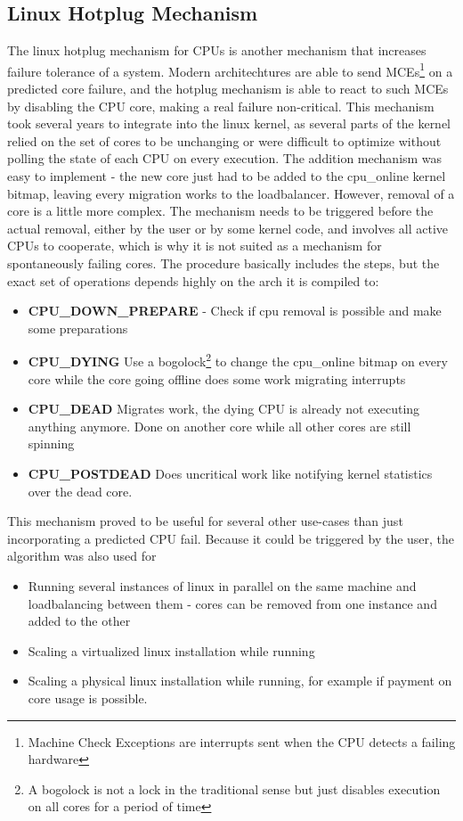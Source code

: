 \documentclass[a4paper,10pt,twoside]{article}
\begin{document}
\subsection{Linux Hotplug Mechanism} \label{hotplug}
The linux hotplug mechanism for CPUs \cite{Linux_Hotplug} is another mechanism that increases failure tolerance of a system. Modern architechtures are able to send MCEs\footnote{Machine Check Exceptions are interrupts sent when the CPU detects a failing hardware} on a predicted core failure, and the hotplug mechanism is able to react to such MCEs by disabling the CPU core, making a real failure non-critical. This mechanism took several years to integrate into the linux kernel, as several parts of the kernel relied on the set of cores to be unchanging or were difficult to optimize without polling the state of each CPU on every execution. The addition mechanism was easy to implement - the new core just had to be added to the cpu\_online kernel bitmap, leaving every migration works to the loadbalancer. However, removal of a core is a little more complex. The mechanism needs to be triggered before the actual removal, either by the user or by some kernel code, and involves all active CPUs to cooperate, which is why it is not suited as a mechanism for spontaneously failing cores. The procedure basically includes the steps, but the exact set of operations depends highly on the arch it is compiled to:
\begin{itemize}
	\item \textbf{CPU\_DOWN\_PREPARE} - Check if cpu removal is possible and make some preparations
	\item \textbf{CPU\_DYING} Use a bogolock\footnote{A bogolock is not a lock in the traditional sense but just disables execution on all cores for a period of time} to change the cpu\_online bitmap on every core while the core going offline does some work migrating interrupts
	\item \textbf{CPU\_DEAD} Migrates work, the dying CPU is already not executing anything anymore. Done on another core while all other cores are still spinning
	\item \textbf{CPU\_POSTDEAD} Does uncritical work like notifying kernel statistics over the dead core.
\end{itemize}

This mechanism proved to be useful for several other use-cases than just incorporating a predicted CPU fail. Because it could be triggered by the user, the algorithm was also used for
\begin{itemize}
	\item Running several instances of linux in parallel on the same machine and loadbalancing between them - cores can be removed from one instance and added to the other
	\item Scaling a virtualized linux installation while running
	\item Scaling a physical linux installation while running, for example if payment on core usage is possible.
\end{itemize}
\end{document}
